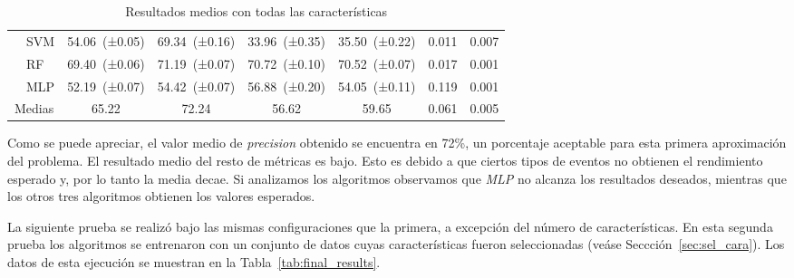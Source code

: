 \begin{table}[!h]
\begin{tabular}{l l c c c c c c}
&                     SVM  & 54.06\ {\footnotesize  (±0.05)} &  69.34\ {\footnotesize  (±0.16)} &  33.96\ {\footnotesize  (±0.35)} &  35.50\ {\footnotesize  (±0.22)} & 0.011  &    0.007  \\
&  RF  & 69.40\ {\footnotesize  (±0.06)} &  71.19\ {\footnotesize  (±0.07)} &  70.72\ {\footnotesize  (±0.10)} &  70.52\ {\footnotesize  (±0.07)} & 0.017  &    0.001  \\
&           MLP  & 52.19\ {\footnotesize  (±0.07)} &  54.42\ {\footnotesize  (±0.07)} &  56.88\ {\footnotesize  (±0.20)} &  54.05\ {\footnotesize  (±0.11)} & 0.119  &    0.001  \\
\bottomrule
\multicolumn{2}{c}{Medias} & 65.22 &	72.24 &	56.62 &	59.65 &	0.061 &	0.005 \\
\bottomrule
\end{tabular}
    \caption{Resultados medios con todas las características}
    \label{tab:final_results_all_features}
\end{table}

Como se puede apreciar, el valor medio de \textit{precision} obtenido se encuentra en 72\%, un porcentaje aceptable para esta primera aproximación del problema. El resultado medio del resto de métricas es bajo. Esto es debido a que ciertos tipos de eventos no obtienen el rendimiento esperado y, por lo tanto la media decae. Si analizamos los algoritmos observamos que \textit{MLP} no alcanza los resultados deseados, mientras que los otros tres algoritmos obtienen los valores esperados.

La siguiente prueba se realizó bajo las mismas configuraciones que la primera, a excepción del número de características. En esta segunda prueba los algoritmos se entrenaron con un conjunto de datos cuyas características fueron seleccionadas (veáse Seccción~\ref{sec:sel_cara}). Los datos de esta ejecución se muestran en la Tabla~\ref{tab:final_results}.

